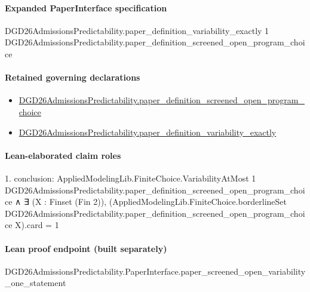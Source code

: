 \documentclass[10pt]{article}
\begin{document}
\paragraph{Expanded PaperInterface specification}
\begin{ReviewVerbatim}
DGD26AdmissionsPredictability.paper_definition_variability_exactly 1
  DGD26AdmissionsPredictability.paper_definition_screened_open_program_choice
\end{ReviewVerbatim}

\paragraph{Retained governing declarations}
\begin{itemize}\raggedright
\item \hyperlink{governing-declaration-2a1d5642d4371781}{DGD26\allowbreak{}Admissions\allowbreak{}Predictability.\allowbreak{}paper\_\allowbreak{}definition\_\allowbreak{}screened\_\allowbreak{}open\_\allowbreak{}program\_\allowbreak{}choice}
\item \hyperlink{governing-declaration-ce6697be3f1c2256}{DGD26\allowbreak{}Admissions\allowbreak{}Predictability.\allowbreak{}paper\_\allowbreak{}definition\_\allowbreak{}variability\_\allowbreak{}exactly}
\end{itemize}
\paragraph{Lean-elaborated claim roles}\begin{ReviewVerbatim}
1. conclusion: AppliedModelingLib.FiniteChoice.VariabilityAtMost 1
    DGD26AdmissionsPredictability.paper_definition_screened_open_program_choice ∧
  ∃ (X : Finset (Fin 2)),
    (AppliedModelingLib.FiniteChoice.borderlineSet
          DGD26AdmissionsPredictability.paper_definition_screened_open_program_choice X).card =
      1
\end{ReviewVerbatim}

\paragraph{Lean proof endpoint (built separately)}\begin{ReviewVerbatim}
DGD26AdmissionsPredictability.PaperInterface.paper_screened_open_variability_one_statement
\end{ReviewVerbatim}
\end{document}
